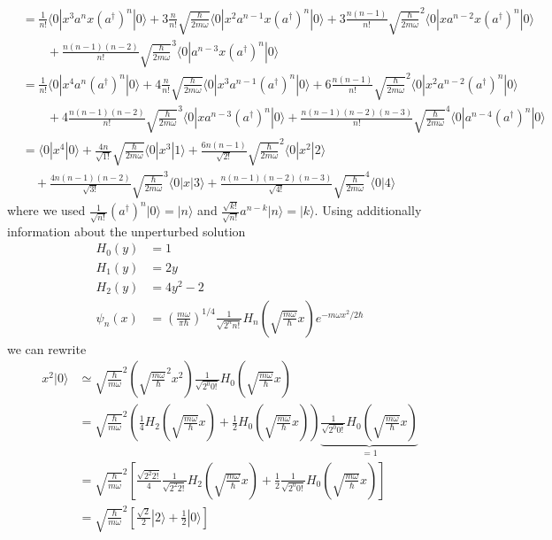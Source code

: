 \documentclass[10pt,a4paper]{book}
\theoremstyle{definition}
\begin{document}
\begin{align}
&=\frac{1}{n!}\langle0|x^3a^nx(a^\dagger)^n|0\rangle+
3\frac{n}{n!}\sqrt{\frac{\hbar}{2m\omega}}\langle0|x^2a^{n-1}x(a^\dagger)^n|0\rangle+3\frac{n(n-1)}{n!}\sqrt{\frac{\hbar}{2m\omega}}^2\langle0|xa^{n-2}x(a^\dagger)^n|0\rangle\\
&\qquad+\frac{n(n-1)(n-2)}{n!}\sqrt{\frac{\hbar}{2m\omega}}^3\langle0|a^{n-3}x(a^\dagger)^n|0\rangle\\
&=\frac{1}{n!}\langle0|x^4a^n(a^\dagger)^n|0\rangle+
4\frac{n}{n!}\sqrt{\frac{\hbar}{2m\omega}}\langle0|x^3a^{n-1}(a^\dagger)^n|0\rangle+6\frac{n(n-1)}{n!}\sqrt{\frac{\hbar}{2m\omega}}^2\langle0|x^2a^{n-2}(a^\dagger)^n|0\rangle\\
&\qquad+4\frac{n(n-1)(n-2)}{n!}\sqrt{\frac{\hbar}{2m\omega}}^3\langle0|xa^{n-3}(a^\dagger)^n|0\rangle+\frac{n(n-1)(n-2)(n-3)}{n!}\sqrt{\frac{\hbar}{2m\omega}}^4\langle0|a^{n-4}(a^\dagger)^n|0\rangle\\
&=\langle0|x^4|0\rangle+\frac{4n}{\sqrt{1!}}\sqrt{\frac{\hbar}{2m\omega}}\langle0|x^3|1\rangle+\frac{6n(n-1)}{\sqrt{2!}}\sqrt{\frac{\hbar}{2m\omega}}^2\langle0|x^2|2\rangle\\
&\quad+\frac{4n(n-1)(n-2)}{\sqrt{3!}}\sqrt{\frac{\hbar}{2m\omega}}^3\langle0|x|3\rangle+\frac{n(n-1)(n-2)(n-3)}{\sqrt{4!}}\sqrt{\frac{\hbar}{2m\omega}}^4\langle0|4\rangle
\end{align}
where we used $\frac{1}{\sqrt{n!}}(a^\dagger)^n|0\rangle=|n\rangle$ and $\frac{\sqrt{k!}}{\sqrt{n!}}a^{n-k}|n\rangle=|k\rangle$.
Using additionally information about the unperturbed solution
\begin{align}
H_0(y)&=1\\
H_1(y)&=2y\\
H_2(y)&=4y^2-2\\
\psi_n(x)&=\left(\frac{m\omega}{\pi\hbar}\right)^{1/4}\frac{1}{\sqrt{2^n n!}}H_n\left(\sqrt{\frac{m\omega}{\hbar}}x\right)e^{-m\omega x^2/2\hbar}
\end{align}
we can rewrite
\begin{align}
x^2|0\rangle
&\simeq \sqrt{\frac{\hbar}{m\omega}}^2\left(\sqrt{\frac{m\omega}{\hbar}}^2x^2\right)\frac{1}{\sqrt{2^0 0!}}H_0(\sqrt{\frac{m\omega}{\hbar}}x)\\
&=\sqrt{\frac{\hbar}{m\omega}}^2\left(\frac{1}{4}H_2(\sqrt{\frac{m\omega}{\hbar}}x)+\frac{1}{2}H_0(\sqrt{\frac{m\omega}{\hbar}}x)\right)\underbrace{\frac{1}{\sqrt{2^0 0!}}H_0(\sqrt{\frac{m\omega}{\hbar}}x)}_{=1}\\
&=\sqrt{\frac{\hbar}{m\omega}}^2\left[\frac{\sqrt{2^2 2!}}{4}\frac{1}{\sqrt{2^2 2!}}H_2(\sqrt{\frac{m\omega}{\hbar}}x)+\frac{1}{2}\frac{1}{\sqrt{2^0 0!}}H_0(\sqrt{\frac{m\omega}{\hbar}}x)\right]\\
&=\sqrt{\frac{\hbar}{m\omega}}^2\left[\frac{\sqrt{2}}{2}|2\rangle+\frac{1}{2}|0\rangle\right]
\end{align}
\end{document}
